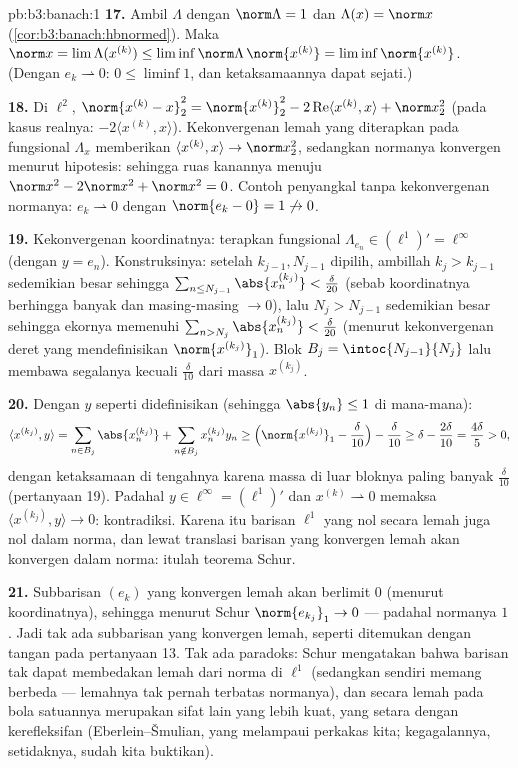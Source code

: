 \begin{solution}{pb:b3:banach:1}
\textbf{17.} Ambil $\Lambda$ dengan $\norm\Lambda = 1$ dan
$\Lambda(x) = \norm x$ (\cref{cor:b3:banach:hbnormed}). Maka
$\norm x = \lim\Lambda(x^{(k)}) \leq
\liminf\norm\Lambda\,\norm{x^{(k)}} =
\liminf\norm{x^{(k)}}$. (Dengan $e_k \rightharpoonup 0$: $0
\leq \liminf 1$, dan ketaksamaannya dapat sejati.)

\textbf{18.} Di $\ell^2$, $\norm{x^{(k)} - x}_2^2 =
\norm{x^{(k)}}_2^2 - 2\operatorname{Re}\langle x^{(k)},
x\rangle + \norm x_2^2$ (pada kasus realnya: $-2\langle x^{(k)},
x\rangle$). Kekonvergenan lemah yang diterapkan pada fungsional
$\Lambda_x$ memberikan $\langle x^{(k)}, x\rangle \to \norm
x_2^2$, sedangkan normanya konvergen menurut hipotesis: sehingga ruas kanannya
menuju $\norm x^2 - 2\norm x^2 + \norm x^2 = 0$.
Contoh penyangkal tanpa kekonvergenan normanya: $e_k
\rightharpoonup 0$ dengan $\norm{e_k - 0} = 1 \not\to 0$.

\textbf{19.} Kekonvergenan koordinatnya: terapkan fungsional
$\Lambda_{e_n} \in (\ell^1)' = \ell^\infty$ (dengan $y = e_n$).
Konstruksinya: setelah $k_{j-1}, N_{j-1}$ dipilih, ambillah $k_j >
k_{j-1}$ sedemikian besar sehingga $\sum_{n \leq
N_{j-1}}\abs{x^{(k_j)}_n} < \frac\delta{20}$ (sebab koordinatnya
berhingga banyak dan masing-masing $\to 0$), lalu $N_j > N_{j-1}$ sedemikian besar
sehingga ekornya memenuhi $\sum_{n > N_j}\abs{x^{(k_j)}_n} <
\frac\delta{20}$ (menurut kekonvergenan deret yang mendefinisikan
$\norm{x^{(k_j)}}_1$). Blok $B_j = \intoc{N_{j-1}}{N_j}$
lalu membawa segalanya kecuali $\frac\delta{10}$ dari massa $x^{(k_j)}$.

\textbf{20.} Dengan $y$ seperti didefinisikan (sehingga $\abs{y_n} \leq 1$
di mana-mana):
\[
\langle x^{(k_j)}, y\rangle
= \sum_{n \in B_j}\abs{x^{(k_j)}_n}
+ \sum_{n \notin B_j}x^{(k_j)}_ny_n
\geq \Bigl(\norm{x^{(k_j)}}_1 - \frac\delta{10}\Bigr) -
\frac\delta{10}
\geq \delta - \frac{2\delta}{10} = \frac{4\delta}5 > 0,
\]
dengan ketaksamaan di tengahnya karena massa di luar bloknya paling
banyak $\frac\delta{10}$ (pertanyaan 19). Padahal $y \in
\ell^\infty = (\ell^1)'$ dan $x^{(k)} \rightharpoonup 0$
memaksa $\langle x^{(k_j)}, y\rangle \to 0$: kontradiksi.
Karena itu barisan $\ell^1$ yang nol secara lemah juga nol dalam norma, dan lewat
translasi barisan yang konvergen lemah akan konvergen dalam norma: itulah teorema
Schur.

\textbf{21.} Subbarisan $(e_k)$ yang konvergen lemah akan
berlimit $0$ (menurut koordinatnya), sehingga menurut Schur $\norm{e_{k_j}}_1
\to 0$ --- padahal normanya $1$. Jadi tak ada subbarisan yang konvergen
lemah, seperti ditemukan dengan tangan pada pertanyaan 13. Tak ada
paradoks: Schur mengatakan bahwa barisan tak dapat membedakan  lemah
dari  norma di $\ell^1$ (sedangkan  sendiri
memang berbeda ---  lemahnya tak pernah terbatas normanya), dan
 secara lemah pada bola satuannya merupakan sifat lain
yang lebih kuat, yang setara dengan kerefleksifan
(Eberlein--\v Smulian, yang melampaui perkakas kita; kegagalannya,
setidaknya, sudah kita buktikan).


\end{solution}
